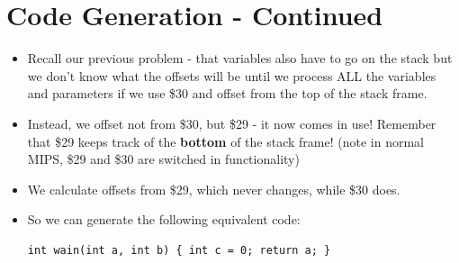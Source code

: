 \documentclass[12pt]{article}
\begin{document}
\section{Code Generation - Continued}
\begin{itemize}
    \item Recall our previous problem - that variables also have to go on the stack but we don't know what the offsets will be until we process ALL the variables and parameters if we use \$30 and offset from the top of the stack frame.
    \item Instead, we offset not from \$30, but \$29 - it now comes in use!  Remember that \$29 keeps track of the \textbf{bottom} of the stack frame! (note in normal MIPS, \$29 and \$30 are switched in functionality)
    \item We calculate offsets from \$29, which never changes, while \$30 does.
    \item So we can generate the following equivalent code:
\begin{lstlisting}[mathescape, numbers=none, breaklines=true]
int wain(int a, int b) { int c = 0; return a; }


\end{lstlisting}
\end{itemize}
\end{document}
